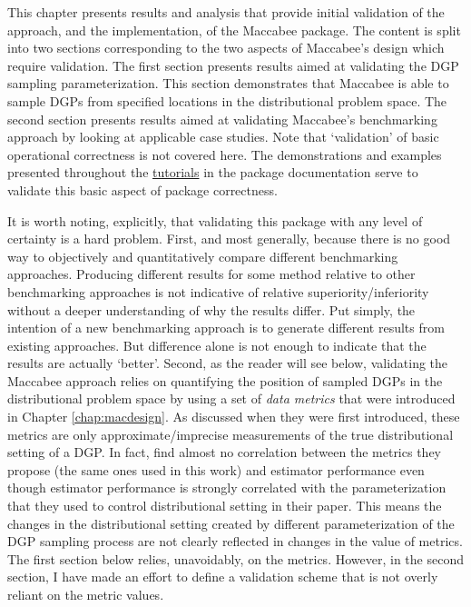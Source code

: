 \documentclass[../main.tex]{subfiles}
\begin{document}

\vspace{\baselineskip}

This chapter presents results and analysis that provide initial validation of the approach, and the implementation, of the Maccabee package. The content is split into two sections corresponding to the two aspects of Maccabee's design which require validation. The first section presents results aimed at validating the DGP sampling parameterization. This section demonstrates that Maccabee is able to sample DGPs from specified locations in the distributional problem space. The second section presents results aimed at validating Maccabee's benchmarking approach by looking at applicable case studies. Note that `validation' of basic operational correctness is not covered here. The demonstrations and examples presented throughout the \href{\RTDurl/usage.html}{tutorials} in the package documentation serve to validate this basic aspect of package correctness.

\vspace{\baselineskip}

It is worth noting, explicitly, that validating this package with any level of certainty is a hard problem. First, and most generally, because there is no good way to objectively and quantitatively compare different benchmarking approaches. Producing different results for some method relative to other benchmarking approaches is not indicative of relative superiority/inferiority without a deeper understanding of why the results differ. Put simply, the intention of a new benchmarking approach is to generate different results from existing approaches. But difference alone is not enough to indicate that the results are actually `better'. Second, as the reader will see below, validating the Maccabee approach relies on quantifying the position of sampled DGPs in the distributional problem space by using a set of \textit{data metrics} that were introduced in Chapter \ref{chap:macdesign}. As discussed when they were first introduced, these metrics are only approximate/imprecise measurements of the true distributional setting of a DGP. In fact, \textcite{Dorie2019Automated1} find almost no correlation between the metrics they propose (the same ones used in this work) and estimator performance even though estimator performance is strongly correlated with the parameterization that they used to control distributional setting in their paper. This means the changes in the distributional setting created by different parameterization of the DGP sampling process are not clearly reflected in changes in the value of metrics. The first section below relies, unavoidably, on the metrics. However, in the second section, I have made an effort to define a validation scheme that is not overly reliant on the metric values.
\end{document}
